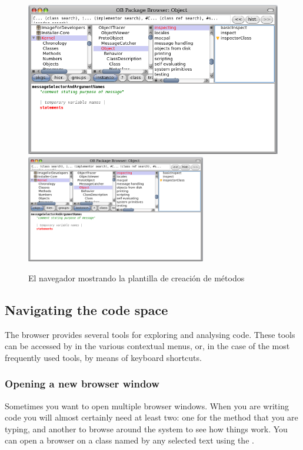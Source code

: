 \documentclass[a4paper,10pt,twoside]{book}
\begin{document}
\begin{figure}[htbp]
   \centering
   \ifluluelse
	   {\includegraphics [width=\textwidth]{SystemBrowserMethodTemplate}}
	   {\includegraphics[width=0.7\textwidth]{SystemBrowserMethodTemplate}}
   \caption{El navegador mostrando la plantilla de creaci\'on de m\'etodos
   }
\end{figure}

\subsection{Navigating the code space}

The browser provides several tools for exploring and analysing code.
These tools can be accessed by  in the various contextual menus, or, in the case of the most frequently used tools, by means of keyboard shortcuts.

\subsubsection{Opening a new browser window}

Sometimes you want to open multiple browser windows.
When you are writing code you will almost certainly need at least two: one for the method that you are typing, and another to browse around the system to see how things work.
You can open a browser on a class named by any selected text using the  . 
\end{document}
